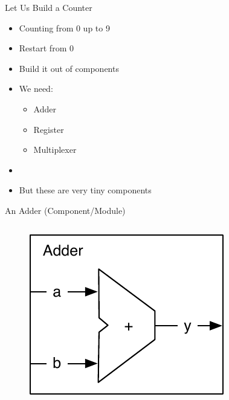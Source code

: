 \begin{frame}[fragile]{Let Us Build a Counter}
\begin{itemize}
\item Counting from 0 up to 9
\item Restart from 0
\item Build it out of components
\item We need:
\begin{itemize}
\item Adder
\item Register
\item Multiplexer
\end{itemize}
\item
\item But these are very tiny components
\end{itemize}
\end{frame}

\begin{frame}[fragile]{An Adder (Component/Module)}
\begin{columns}
\begin{column}{0.4\textwidth}
\begin{figure}
  \includegraphics[scale=\scale]{../figures/components-adder}
\end{figure}
\end{column}
\begin{column}{0.6\textwidth}
\end{column}
\end{columns}
\end{frame}

